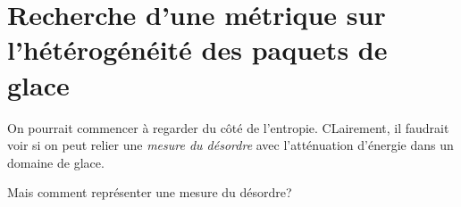 \documentclass[10pt]{article}
\numberwithin{equation}{section}
\begin{document}
\section{Recherche d'une métrique sur l'hétérogénéité des paquets de glace}
\label{sec:org2423729}

On pourrait commencer à regarder du côté de l'entropie.
CLairement, il faudrait voir si on peut relier une \emph{mesure du désordre} avec l'atténuation d'énergie dans un domaine de glace.

Mais comment représenter une mesure du désordre?











\printbibliography
\end{document}
